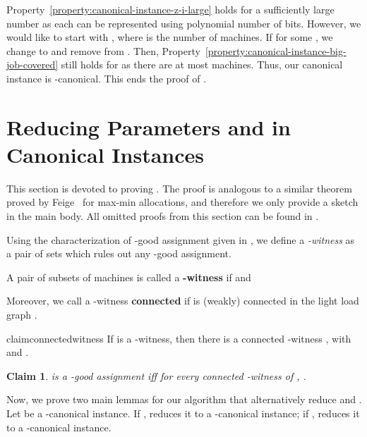 \documentclass[11pt]{article}
\newenvironment{definition}{\begin{Definition}}{\end{Definition}}
\newtheorem{claim}{Claim}[section]
\newtheorem{definition}[lemma]{Definition}
\newtheorem{claim}[lemma]{Claim}
\newcounter{prop}
\begin{document}
Property~\ref{property:canonical-instance-z-i-large} holds for a sufficiently large number  as each  can be represented using polynomial number of bits.  However, we would like to start with , where  is the number of machines. If  for some , we change  to  and remove  from . Then, Property~\ref{property:canonical-instance-big-job-covered} still holds for  as there are at most  machines. Thus, our canonical instance is -canonical.
This ends the proof of .



\section{Reducing Parameters \texorpdfstring{}{p} and \texorpdfstring{}{q} in Canonical Instances}\label{sec:reducing-p-and-q}
This section is devoted to proving . The proof is analogous to a similar theorem proved by Feige~\cite{Fei08} for max-min allocations, and 
therefore we only provide a sketch in the main body. 
All omitted proofs from this section can be found in .
\redpq*

Using the characterization of -good assignment given in , we define a {\em -witness} 
as a pair of sets which rules out any -good assignment.

\begin{definition}[-witness]
A pair  of subsets of machines is called a {\bf -witness} if  and 

Moreover, we call a -witness   {\bf connected} if  is (weakly) connected in the light load graph .
\end{definition}
\noindent


\begin{restatable}{claim}{connectedwitness}
\label{claim:witness-implies-connected-witness}
\label{clm:witness-implies-connected-witness}
If  is a -witness, then there is a connected -witness , with  and .
\end{restatable}

\begin{claim}
\label{claim:alpha-good-equivalent-to-no-witness}
\label{clm:alpha-good-equivalent-to-no-witness}
 is a -good assignment iff for every connected -witness  of , .
\end{claim}

Now, we prove two main lemmas for our algorithm that alternatively reduce  and .   Let  be a -canonical instance. If ,  reduces it to a -canonical instance; if ,  reduces it to a -canonical instance. 
\end{document}
